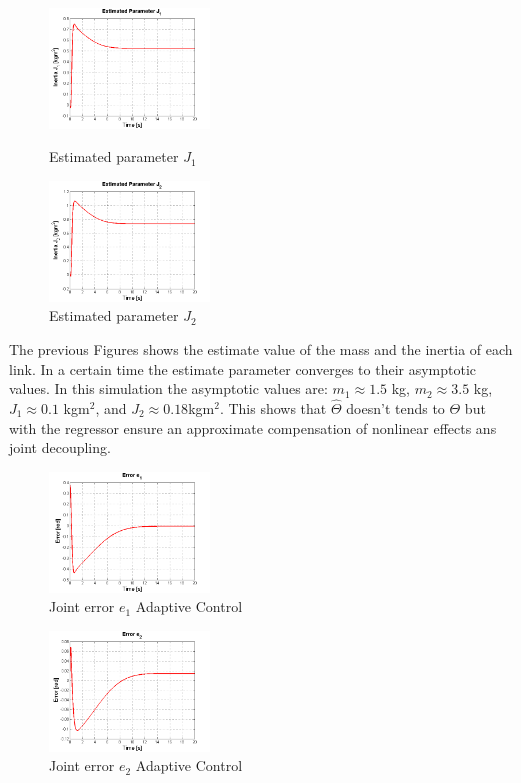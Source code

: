 \begin{figure}[h]
\centering
\includegraphics[width=0.38\textwidth]{imagenes/6-neuronal/J1.png}
 \caption{Estimated parameter $J_1$}
 \label{fig:J1}
 \includegraphics[width=0.38\textwidth]{imagenes/6-neuronal/J2.png}
 \caption{Estimated parameter $J_2$}
 \label{fig:J2}
\end{figure}

The previous Figures shows the estimate value of the mass and the inertia of each link. In a certain time the estimate parameter converges to their asymptotic values. In this simulation the asymptotic values are: $m_1\approx1{.}5$ kg, $m_2\approx3{.}5$ kg, $J_1\approx0{.}1$ kg$\mbox{m}^2$, and $J_2\approx0{.}18$kg$\mbox{m}^2$. This shows that $\hat{\Theta}$ doesn't tends to $\Theta$ but with the regressor ensure an approximate compensation of nonlinear effects ans joint decoupling.\\

\begin{figure}[h]
\centering
\includegraphics[width=0.38\textwidth]{imagenes/6-neuronal/e1.png}
 \caption{Joint error $e_1$ Adaptive Control}
 \label{fig:e1}
\end{figure}

\begin{figure}[h]
\centering
\includegraphics[width=0.38\textwidth]{imagenes/6-neuronal/e2.png}
 \caption{Joint error $e_2$ Adaptive Control}
 \label{fig:e2}
\end{figure}

